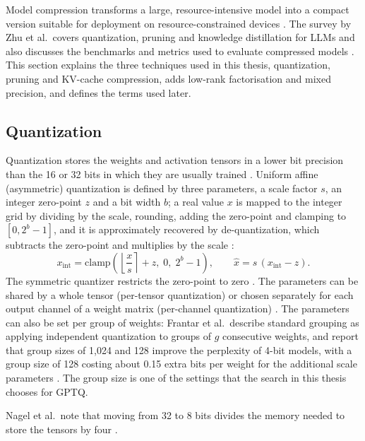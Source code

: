 \documentclass[
11pt, %
english, %
singlespacing, %
headsepline, %
]{MastersDoctoralThesis} %
\begin{document}
Model compression transforms a large, resource-intensive model into a compact version suitable for deployment on resource-constrained devices \cite{zhu2024survey}. The survey by Zhu et al.\ covers quantization, pruning and knowledge distillation for LLMs and also discusses the benchmarks and metrics used to evaluate compressed models \cite{zhu2024survey}. This section explains the three techniques used in this thesis, quantization, pruning and KV-cache compression, adds low-rank factorisation and mixed precision, and defines the terms used later.

\subsection{Quantization}
\label{sec:ch2-quant}

Quantization stores the weights and activation tensors in a lower bit precision than the 16 or 32 bits in which they are usually trained \cite{nagel2021whitepaper}. Uniform affine (asymmetric) quantization is defined by three parameters, a scale factor $s$, an integer zero-point $z$ and a bit width $b$; a real value $x$ is mapped to the integer grid by dividing by the scale, rounding, adding the zero-point and clamping to $[0, 2^b - 1]$, and it is approximately recovered by de-quantization, which subtracts the zero-point and multiplies by the scale \cite{nagel2021whitepaper}:
\begin{equation}
  x_{\mathrm{int}} = \mathrm{clamp}\left( \left\lfloor \frac{x}{s} \right\rceil + z,\; 0,\; 2^b - 1 \right), \qquad
  \hat{x} = s \,(x_{\mathrm{int}} - z).
  \label{eq:ch2-quant}
\end{equation}
The symmetric quantizer restricts the zero-point to zero \cite{nagel2021whitepaper}. The parameters can be shared by a whole tensor (per-tensor quantization) or chosen separately for each output channel of a weight matrix (per-channel quantization) \cite{nagel2021whitepaper}. The parameters can also be set per group of weights: Frantar et al.\ describe standard grouping as applying independent quantization to groups of $g$ consecutive weights, and report that group sizes of 1{,}024 and 128 improve the perplexity of 4-bit models, with a group size of 128 costing about 0.15 extra bits per weight for the additional scale parameters \cite{frantar2023gptq}. The group size is one of the settings that the search in this thesis chooses for GPTQ.

Nagel et al.\ note that moving from 32 to 8 bits divides the memory needed to store the tensors by four \cite{nagel2021whitepaper}.
\end{document}
